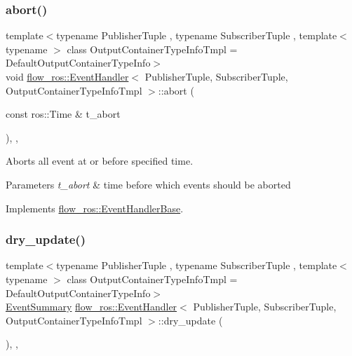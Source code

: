 \subsubsection{\texorpdfstring{abort()}{abort()}}
{\footnotesize\ttfamily template$<$typename Publisher\+Tuple , typename Subscriber\+Tuple , template$<$ typename $>$ class Output\+Container\+Type\+Info\+Tmpl = Default\+Output\+Container\+Type\+Info$>$ \\
void \hyperlink{classflow__ros_1_1_event_handler}{flow\+\_\+ros\+::\+Event\+Handler}$<$ Publisher\+Tuple, Subscriber\+Tuple, Output\+Container\+Type\+Info\+Tmpl $>$\+::abort (\begin{DoxyParamCaption}\item[{const ros\+::\+Time \&}]{t\+\_\+abort }\end{DoxyParamCaption})\hspace{0.3cm}{\ttfamily [inline]}, {\ttfamily [override]}, {\ttfamily [virtual]}}



Aborts all event at or before specified time. 


\begin{DoxyParams}{Parameters}
{\em t\+\_\+abort} & time before which events should be aborted \\
\hline
\end{DoxyParams}


Implements \hyperlink{classflow__ros_1_1_event_handler_base_a5611152cffdc62a4215726d19ce58ab5}{flow\+\_\+ros\+::\+Event\+Handler\+Base}.

\mbox{\label{classflow__ros_1_1_event_handler_abc2f1821d85ab05d86270cbf20da6cd9}} 
\subsubsection{\texorpdfstring{dry\+\_\+update()}{dry\_update()}}
{\footnotesize\ttfamily template$<$typename Publisher\+Tuple , typename Subscriber\+Tuple , template$<$ typename $>$ class Output\+Container\+Type\+Info\+Tmpl = Default\+Output\+Container\+Type\+Info$>$ \\
\hyperlink{structflow__ros_1_1_event_summary}{Event\+Summary} \hyperlink{classflow__ros_1_1_event_handler}{flow\+\_\+ros\+::\+Event\+Handler}$<$ Publisher\+Tuple, Subscriber\+Tuple, Output\+Container\+Type\+Info\+Tmpl $>$\+::dry\+\_\+update (\begin{DoxyParamCaption}{ }\end{DoxyParamCaption})\hspace{0.3cm}{\ttfamily [inline]}, {\ttfamily [override]}, {\ttfamily [virtual]}}







